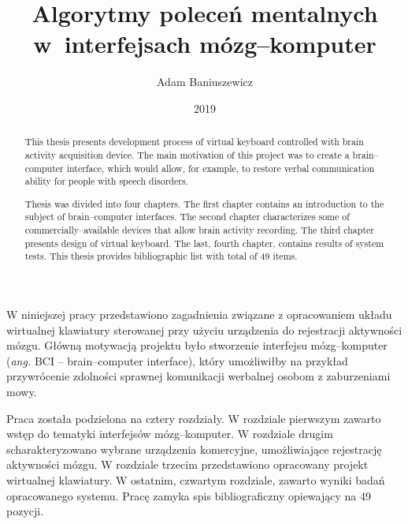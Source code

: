 \documentclass[skorowidz,skroty]{dyplomWEZUT}
\author{Adam Baniuszewicz}
\title{Algorytmy poleceń mentalnych w~interfejsach mózg--komputer}
\date{2019}
\begin{document}
\begin{streszczenie}
W niniejszej pracy przedstawiono zagadnienia związane z opracowaniem układu wirtualnej klawiatury sterowanej przy użyciu urządzenia do rejestracji aktywności mózgu. Główną motywacją projektu było stworzenie interfejsu mózg--komputer (\textit{ang.} BCI -- brain--computer interface), który umożliwiłby na przykład przywrócenie zdolności sprawnej komunikacji werbalnej osobom z zaburzeniami mowy.

Praca została podzielona na cztery rozdziały. W rozdziale pierwszym zawarto wstęp do tematyki interfejsów mózg--komputer. W rozdziale drugim scharakteryzowano wybrane urządzenia komercyjne, umożliwiające rejestrację aktywności mózgu. W rozdziale trzecim przedstawiono opracowany projekt wirtualnej klawiatury. W ostatnim, czwartym rozdziale, zawarto wyniki badań opracowanego systemu. Pracę zamyka spis bibliograficzny opiewający na 49 pozycji.  
\end{streszczenie}

\begin{abstract}
This thesis presents development process of virtual keyboard controlled with brain activity acquisition device. The main motivation of this project was to create a brain--computer interface, which would allow, for example, to restore verbal communication ability for people with speech disorders.

Thesis was divided into four chapters. The first chapter contains an introduction to the subject of brain--computer interfaces. The second chapter characterizes some of commercially--available devices that allow brain activity recording. The third chapter presents design of virtual keyboard. The last, fourth chapter, contains results of system tests. This thesis provides bibliographic list with total of 49 items.
\end{abstract}

\maketitle
\end{document}
